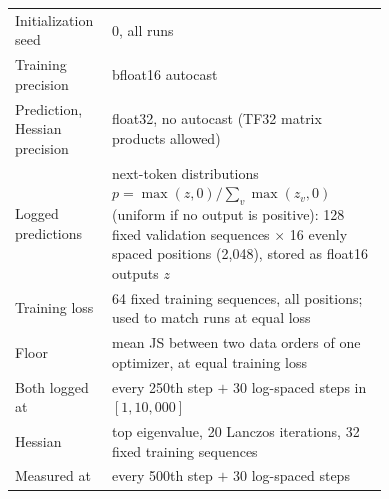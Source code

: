 \begin{center}
\begin{tabular}{@{}lp{0.74\linewidth}@{}}
Initialization seed & 0, all runs \\
Training precision & bfloat16 autocast \\
Prediction, Hessian precision & float32, no autocast (TF32 matrix products allowed) \\
\hline
Logged predictions & next-token distributions $p=\max(z,0)/\sum_v\max(z_v,0)$ (uniform if no output is positive):
  128 fixed validation sequences $\times$ 16 evenly spaced positions (2{,}048), stored as float16 outputs $z$ \\
Training loss & 64 fixed training sequences, all positions; used to match runs at equal loss \\
Floor & mean JS between two data orders of one optimizer, at equal training loss \\
Both logged at & every 250th step $+$ 30 log-spaced steps in $[1, 10{,}000]$ \\
\hline
Hessian & top eigenvalue, 20 Lanczos iterations, 32 fixed training sequences \\
Measured at & every 500th step $+$ 30 log-spaced steps \\
\hline
\end{tabular}
\end{center}

